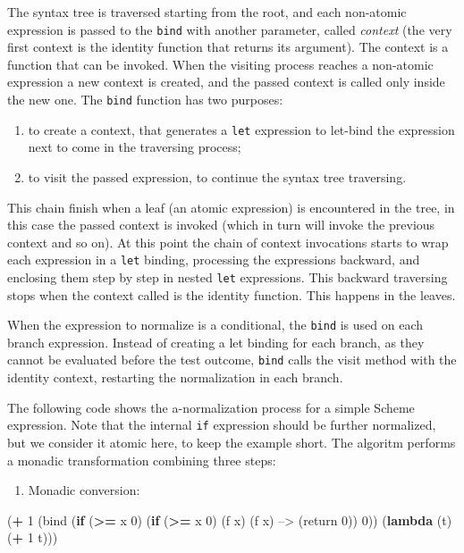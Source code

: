 \documentclass[12pt,a4paper,oneside,openright]{book}
\newenvironment{Shaded}{\begin{snugshade}}{\end{snugshade}}
\newcommand{\KeywordTok}[1]{\textcolor[rgb]{0.13,0.29,0.53}{\textbf{{#1}}}}
\newcommand{\DecValTok}[1]{\textcolor[rgb]{0.00,0.00,0.81}{{#1}}}
\newcommand{\NormalTok}[1]{{#1}}
\providecommand{\tightlist}{%
  \setlength{\itemsep}{0pt}\setlength{\parskip}{0pt}}
\begin{document}
The syntax tree is traversed starting from the root, and each non-atomic
expression is passed to the \texttt{bind} with another parameter, called
\emph{context} (the very first context is the identity function that
returns its argument). The context is a function that can be invoked.
When the visiting process reaches a non-atomic expression a new context
is created, and the passed context is called only inside the new one.
The \texttt{bind} function has two purposes:

\begin{enumerate}
\def\labelenumi{\arabic{enumi}.}
\tightlist
\item
  to create a context, that generates a \texttt{let} expression to
  let-bind the expression next to come in the traversing process;
\item
  to visit the passed expression, to continue the syntax tree
  traversing.
\end{enumerate}

This chain finish when a leaf (an atomic expression) is encountered in
the tree, in this case the passed context is invoked (which in turn will
invoke the previous context and so on). At this point the chain of
context invocations starts to wrap each expression in a \texttt{let}
binding, processing the expressions backward, and enclosing them step by
step in nested \texttt{let} expressions. This backward traversing stops
when the context called is the identity function. This happens in the
leaves.

When the expression to normalize is a conditional, the \texttt{bind} is
used on each branch expression. Instead of creating a let binding for
each branch, as they cannot be evaluated before the test outcome,
\texttt{bind} calls the visit method with the identity context,
restarting the normalization in each branch.

The following code shows the a-normalization process for a simple Scheme
expression. Note that the internal \texttt{if} expression should be
further normalized, but we consider it atomic here, to keep the example
short. The algoritm performs a monadic transformation combining three
steps:

\begin{enumerate}
\def\labelenumi{\arabic{enumi}.}
\tightlist
\item
  Monadic conversion:
\end{enumerate}

\begin{Shaded}
\begin{Highlighting}[]
   \NormalTok{(}\KeywordTok{+} \DecValTok{1}                             \NormalTok{(bind (}\KeywordTok{if} \NormalTok{(}\KeywordTok{>=} \NormalTok{x }\DecValTok{0}\NormalTok{)}
      \NormalTok{(}\KeywordTok{if} \NormalTok{(}\KeywordTok{>=} \NormalTok{x }\DecValTok{0}\NormalTok{)                            (f x)}
          \NormalTok{(f x)             -->               (return }\DecValTok{0}\NormalTok{))}
          \DecValTok{0}\NormalTok{))                             (}\KeywordTok{lambda} \NormalTok{(t) (}\KeywordTok{+} \DecValTok{1} \NormalTok{t)))}
\end{Highlighting}
\end{Shaded}
\end{document}
